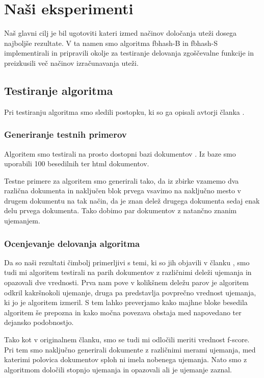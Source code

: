 \documentclass{acm_proc_article-sp}
\begin{document}
\section{Na\v{s}i eksperimenti}
Naš glavni cilj je bil ugotoviti kateri izmed načinov določanja uteži dosega najboljše rezultate. V ta namen smo algoritma fbhash-B in fbhash-S implementirali in pripravili okolje za testiranje delovanja zgoščevalne funkcije in preizkusili več načinov izračunavanja uteži.

\subsection{Testiranje algoritma}
Pri testiranju algoritma smo sledili postopku, ki so ga opisali avtorji članka \cite{fbhash}.

\subsubsection{Generiranje testnih primerov}
Algoritem smo testirali na prosto dostopni bazi dokumentov \cite{roussev2011evaluation}. Iz baze smo uporabili 100 besedilnih ter html dokumentov.

Testne primere za algoritem smo generirali tako, da iz zbirke vzamemo dva različna dokumenta in naključen blok prvega vsavimo na naključno mesto v drugem dokumentu na tak način, da je znan delež drugega dokumenta sedaj enak delu prvega dokumenta. Tako dobimo par dokumentov z natančno znanim ujemanjem.

\subsubsection{Ocenjevanje delovanja algoritma}
Da so naši rezultati čimbolj primerljivi s temi, ki so jih objavili v članku \cite{fbhash}, smo tudi mi algoritem testirali na parih dokumentov z različnimi deleži ujemanja in opazovali dve vrednosti. Prva nam pove v kolikšnem deležu parov je algoritem odkril kakršnokoli ujemanje, druga pa predstavlja povprečno vrednost ujemanja, ki jo je algoritem izmeril. S tem lahko preverjamo kako majhne bloke besedila algoritem še prepozna in kako močna povezava obstaja med napovedano ter dejansko podobnostjo.

Tako kot v originalnem članku, smo se tudi mi odločili meriti vrednost f-score. Pri tem smo naključno generirali dokumente z različnimi merami ujemanja, med katerimi polovica dokumentov sploh ni imela nobenega ujemanja. Nato smo z algoritmom določili stopnjo ujemanja in opazovali ali je ujemanje zaznal.
\end{document}
